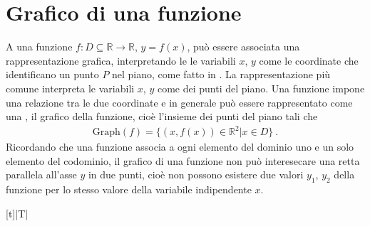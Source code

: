 \documentclass[letterpaper,10pt,italian]{jupyterBook}
\begin{document}
\section{Grafico di una funzione}
\label{\detokenize{ch/precalculus/real-functions:grafico-di-una-funzione}}\label{\detokenize{ch/precalculus/real-functions:math-hs-precalculus-real-functions-plot}}
\sphinxAtStartPar
A una funzione \(f: D \subseteq \mathbb{R} \rightarrow \mathbb{R}\), \(y = f(x)\), può essere associata una rappresentazione grafica, interpretando le le variabili \(x\), \(y\) come le coordinate che identificano un punto \(P\) nel piano, come fatto in {\hyperref[\detokenize{ch/analytic_geometry:geometry-analytic}]{}}. La rappresentazione più comune interpreta le variabili \(x\), \(y\) come  dei punti del piano. Una funzione impone una relazione tra le due coordinate e in generale può essere rappresentato come una {\hyperref[\detokenize{ch/analytic_geometry/analytic_geometry_2d/curves:geometry-analytic-2d-curves}]{}}, il grafico della funzione, cioè l’insieme dei punti del piano tali che
\begin{equation*}
\begin{split}\text{Graph}( f ) = \{ (x, f(x)) \in \mathbb{R}^2 | x \in D \} \ .\end{split}
\end{equation*}
\sphinxAtStartPar
Ricordando che una funzione associa a ogni elemento del dominio uno e un solo elemento del codominio, il grafico di una funzione non può interesecare una retta parallela all’asse \(y\) in due punti, cioè non possono esistere due valori \(y_1\), \(y_2\) della funzione per lo stesso valore della variabile indipendente \(x\).


\begin{savenotes}\sphinxattablestart
\centering
\begin{tabulary}{\linewidth}[t]{|T|}
\hline

\sphinxAtStartPar
{}
\\
\hline
\end{tabulary}
\par
\sphinxattableend\end{savenotes}
\end{document}
